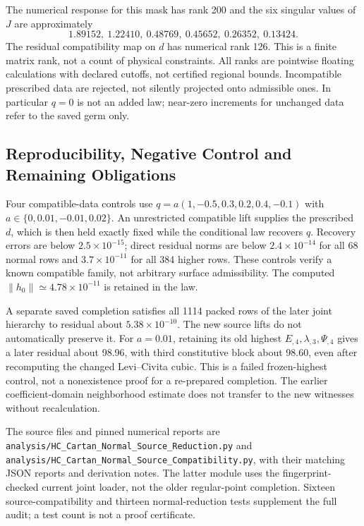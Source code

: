 The numerical response for this mask has rank 200 and the six singular
values of $J$ are approximately
\[
 1.89152,\ 1.22410,\ 0.48769,\ 0.45652,\ 0.26352,\ 0.13424.
\]
The residual compatibility map on $d$ has numerical rank 126. This is a
finite matrix rank, not a count of physical constraints. All ranks are
pointwise floating calculations with declared cutoffs, not certified
regional bounds. Incompatible prescribed data are rejected, not silently
projected onto admissible ones. In particular $q=0$ is not an added law;
near-zero increments for unchanged data refer to the saved germ only.

\subsection{Reproducibility, Negative Control and Remaining Obligations}
\label{v490:cartan-evidence}

Four compatible-data controls use
$q=a(1,-0.5,0.3,0.2,0.4,-0.1)$ with
$a\in\{0,0.01,-0.01,0.02\}$. An unrestricted compatible lift supplies
the prescribed $d$, which is then held exactly fixed while the conditional
law recovers $q$. Recovery errors are below $2.5\times10^{-15}$;
direct residual norms are below $2.4\times10^{-14}$ for all 68 normal
rows and $3.7\times10^{-11}$ for all 384 higher rows. These controls
verify a known compatible family, not arbitrary surface admissibility.
The computed $\|h_0\|\simeq4.78\times10^{-11}$ is retained in the law.

A separate saved completion satisfies all 1114 packed rows of the later
joint hierarchy to residual about $5.38\times10^{-10}$. The new source
lifts do not automatically preserve it. For $a=0.01$, retaining its old
highest $E_{,4},\lambda_{,3},\Psi_{,4}$ gives a later residual about
98.96, with third constitutive block about 98.60, even after recomputing
the changed Levi--Civita cubic. This is a failed frozen-highest control,
not a nonexistence proof for a re-prepared completion. The earlier
coefficient-domain neighborhood estimate does not transfer to the new
witnesses without recalculation.

The source files and pinned numerical reports are
\nolinkurl{analysis/HC_Cartan_Normal_Source_Reduction.py} and
\nolinkurl{analysis/HC_Cartan_Normal_Source_Compatibility.py}, with
their matching JSON reports and derivation notes. The latter module uses
the fingerprint-checked current joint loader, not the older regular-point
completion. Sixteen source-compatibility and thirteen normal-reduction
tests supplement the full audit; a test count is not a proof certificate.

